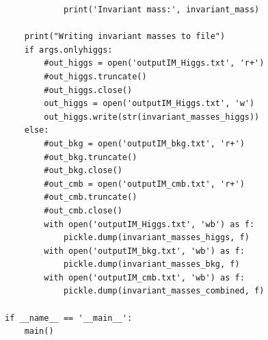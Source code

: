 \documentclass{article}
\begin{document}
\begin{lstlisting}
            print('Invariant mass:', invariant_mass)

    print("Writing invariant masses to file")
    if args.onlyhiggs:
        #out_higgs = open('outputIM_Higgs.txt', 'r+')
        #out_higgs.truncate()
        #out_higgs.close()
        out_higgs = open('outputIM_Higgs.txt', 'w')
        out_higgs.write(str(invariant_masses_higgs))
    else:
        #out_bkg = open('outputIM_bkg.txt', 'r+')
        #out_bkg.truncate()
        #out_bkg.close()
        #out_cmb = open('outputIM_cmb.txt', 'r+')
        #out_cmb.truncate()
        #out_cmb.close()
        with open('outputIM_Higgs.txt', 'wb') as f:
            pickle.dump(invariant_masses_higgs, f)
        with open('outputIM_bkg.txt', 'wb') as f:
            pickle.dump(invariant_masses_bkg, f)
        with open('outputIM_cmb.txt', 'wb') as f:
            pickle.dump(invariant_masses_combined, f)

if __name__ == '__main__':
    main()



\end{lstlisting}
\end{document}
